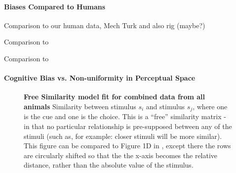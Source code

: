 

\paragraph{Biases Compared to Humans}

Comparison to our human data, Mech Turk and also rig (maybe?)

Comparison to \cite{bae_why_2015}

Comparison to \cite{panichello_error-correcting_2019}

\paragraph{Cognitive Bias vs. Non-uniformity in Perceptual Space}

\begin{figure}

\caption{\textbf{Free Similarity model fit for combined data from all animals}
Similarity between stimulus $s_i$ and stimulus $s_j$, where one is the cue and one is the choice. This is a ``free'' similarity matrix - in that no particular relationship is pre-supposed between any of the stimuli (such as, for example: closer stimuli will be more similar). This figure can be compared to Figure 1D in \cite{schurgin_psychophysical_2020}, except there the rows are circularly shifted so that the the x-axis becomes the relative distance, rather than the absolute value of the stimulus. %
} 
\label{fig:SimilarityMatrixCombined}
\end{figure}

